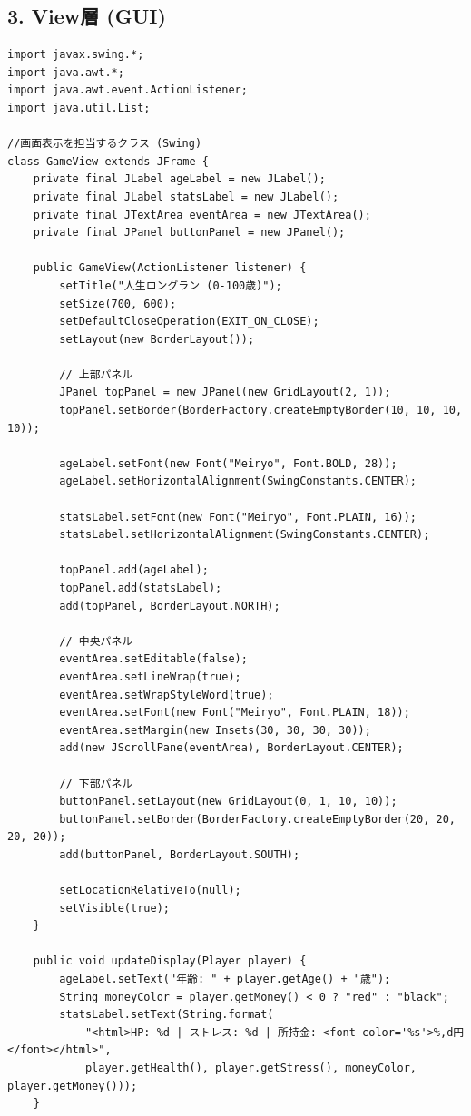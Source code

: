 \documentclass[a4paper,11pt]{jsarticle}
\begin{document}
\subsection*{3. View層 (GUI)}
\begin{lstlisting}[caption=GameView.java]
import javax.swing.*;
import java.awt.*;
import java.awt.event.ActionListener;
import java.util.List;

//画面表示を担当するクラス (Swing)
class GameView extends JFrame {
    private final JLabel ageLabel = new JLabel();
    private final JLabel statsLabel = new JLabel(); 
    private final JTextArea eventArea = new JTextArea();
    private final JPanel buttonPanel = new JPanel();

    public GameView(ActionListener listener) {
        setTitle("人生ロングラン (0-100歳)");
        setSize(700, 600);
        setDefaultCloseOperation(EXIT_ON_CLOSE);
        setLayout(new BorderLayout());

        // 上部パネル
        JPanel topPanel = new JPanel(new GridLayout(2, 1));
        topPanel.setBorder(BorderFactory.createEmptyBorder(10, 10, 10, 10));
        
        ageLabel.setFont(new Font("Meiryo", Font.BOLD, 28));
        ageLabel.setHorizontalAlignment(SwingConstants.CENTER);
        
        statsLabel.setFont(new Font("Meiryo", Font.PLAIN, 16));
        statsLabel.setHorizontalAlignment(SwingConstants.CENTER);

        topPanel.add(ageLabel);
        topPanel.add(statsLabel);
        add(topPanel, BorderLayout.NORTH);

        // 中央パネル
        eventArea.setEditable(false);
        eventArea.setLineWrap(true);
        eventArea.setWrapStyleWord(true);
        eventArea.setFont(new Font("Meiryo", Font.PLAIN, 18));
        eventArea.setMargin(new Insets(30, 30, 30, 30));
        add(new JScrollPane(eventArea), BorderLayout.CENTER);

        // 下部パネル
        buttonPanel.setLayout(new GridLayout(0, 1, 10, 10));
        buttonPanel.setBorder(BorderFactory.createEmptyBorder(20, 20, 20, 20));
        add(buttonPanel, BorderLayout.SOUTH);

        setLocationRelativeTo(null);
        setVisible(true);
    }

    public void updateDisplay(Player player) {
        ageLabel.setText("年齢: " + player.getAge() + "歳");
        String moneyColor = player.getMoney() < 0 ? "red" : "black";
        statsLabel.setText(String.format(
            "<html>HP: %d | ストレス: %d | 所持金: <font color='%s'>%,d円</font></html>", 
            player.getHealth(), player.getStress(), moneyColor, player.getMoney()));
    }


\end{lstlisting}
\end{document}
